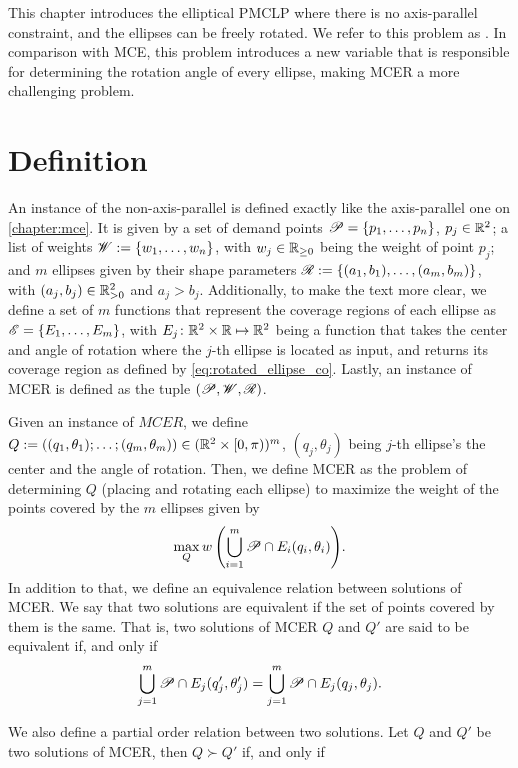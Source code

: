 This chapter introduces the elliptical PMCLP where there is no axis-parallel constraint, and the ellipses can be freely rotated. We refer to this problem as . In comparison with MCE, this problem introduces a new variable that is responsible for determining the rotation angle of every ellipse, making MCER a more challenging problem.

\section{Definition}

An instance of the non-axis-parallel is defined exactly like the axis-parallel one on \autoref{chapter:mce}. It is given by a set of demand points $\mathscr{P}=\{p_1, \dots, p_n\}$, $p_j\in\mathbb{R}^2$; a list of weights $\mathscr{W}:=\{w_1, \dots, w_n\}$, with $w_j\in\mathbb{R}_{\ge0}$ being the weight of point $p_j$;
and $m$ ellipses given by their shape parameters $\mathscr{R}:=\{(a_1, b_1), \dots, (a_m, b_m)\}$, with $(a_j, b_j)\in\mathbb{R}_{>0}^2$ and $a_j>b_j$.
Additionally, to make the text more clear, we define a set of $m$ functions that represent the coverage regions of each ellipse as $\mathscr{E} = \{E_1, \dots, E_m\}$, with $E_j\colon \mathbb{R}^2\times\mathbb{R} \mapsto \mathbb{R}^2$ being a function that takes the center and angle of rotation where the $j$-th ellipse is located as input, and returns its coverage region as defined by \autoref{eq:rotated_ellipse_co}.
Lastly, an instance of MCER is defined as the tuple $(\mathscr{P}, \mathscr{W}, \mathscr{R})$.

Given an instance of $MCER$, we define $Q:=((q_1,\theta_1); \dots; (q_m, \theta_m)) \in (\mathbb{R}^{2}\times[0, \pi))^m$, $(q_j, \theta_j)$ being $j$-th ellipse's the center and the angle of rotation. Then, we define MCER as the problem of determining $Q$ (placing and rotating each ellipse) to maximize the weight of the points covered by the $m$ ellipses given by
\begin{equation}\label{eq:optMCEn}
\max_{Q}{w\left(\bigcup_{i=1}^{m} \mathscr{P} \cap E_i(q_i, \theta_i)\right)}.
\end{equation}
In addition to that, we define an equivalence relation between solutions of MCER. We say that two solutions are equivalent if the set of points covered by them is the same. That is, two solutions of MCER $Q$ and $Q'$ are said to be equivalent if, and only if 
$$\bigcup_{j=1}^m\mathscr{P} \cap E_j(q_j', \theta_j') = \bigcup_{j=1}^m\mathscr{P} \cap E_j(q_j, \theta_j).$$

We also define a partial order relation between two solutions. Let $Q$ and $Q'$ be two solutions of MCER, then $Q \succ Q'$ if, and only if

